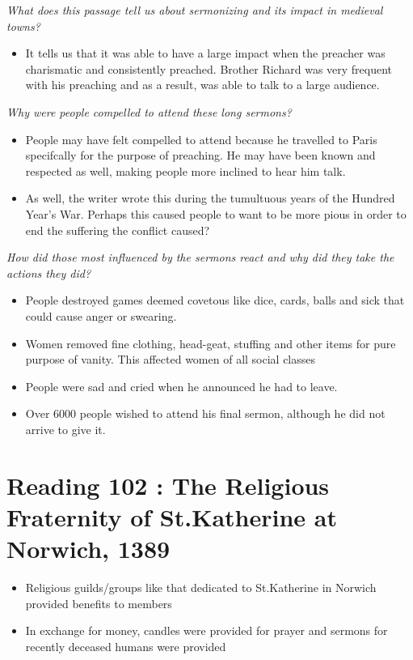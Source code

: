 \documentclass[12pt]{article}
\begin{document}
\textit{What does this passage tell us about sermonizing and its impact in medieval towns?}
\begin{itemize}
	\item It tells us that it was able to have a large impact when the preacher was charismatic and consistently preached. Brother Richard was very frequent with his preaching and as a result, was able to talk to a large audience.
\end{itemize}
\textit{Why were people compelled to attend these long sermons?}
\begin{itemize}
	\item People may have felt compelled to attend because he travelled to Paris specifcally for the purpose of preaching. He may have been known and respected as well, making people more inclined to hear him talk.
	\item As well, the writer wrote this during the tumultuous years of the Hundred Year's War. Perhaps this caused people to want to be more pious in order to end the suffering the conflict caused?
\end{itemize}
\textit{How did those most influenced by the sermons react and why did they take the actions they did?}
\begin{itemize}
	\item People destroyed games deemed covetous like dice, cards, balls and sick that could cause anger or swearing.
	\item Women removed fine clothing, head-geat, stuffing and other items for pure purpose of vanity. This affected women of all social classes
	\item People were sad and cried when he announced he had to leave.
	\item Over 6000 people wished to attend his final sermon, although he did not arrive to give it.
\end{itemize}

\section*{Reading 102 : The Religious Fraternity of St.Katherine at Norwich, 1389}

\begin{itemize}
	\item Religious guilds/groups like that dedicated to St.Katherine in Norwich provided benefits to members
	\item In exchange for money, candles were provided for prayer and sermons for recently deceased humans were provided
\end{itemize}
\end{document}

